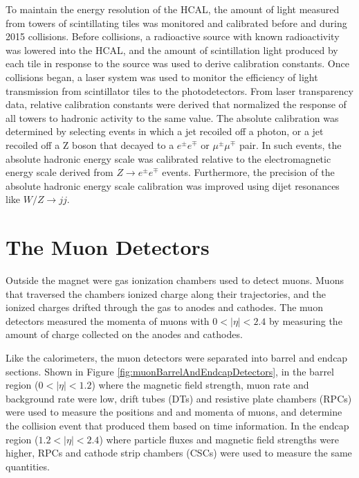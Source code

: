 To maintain the energy resolution of the HCAL, the amount of light measured from towers of scintillating tiles 
was monitored and calibrated before and during 2015 collisions.  Before collisions, a radioactive source 
with known radioactivity was lowered into the HCAL, and the amount of scintillation light produced by each tile 
in response to the source was used to derive calibration constants.  Once collisions began, a laser system 
was used to monitor the efficiency of light transmission from scintillator tiles to the photodetectors.  
From laser transparency data, relative calibration constants were 
derived that normalized the response of all towers to hadronic activity to the same value.  The absolute 
calibration was determined by selecting events in which a jet recoiled off a photon, or a jet recoiled off a Z boson that 
decayed to a $e^{\pm}e^{\mp}$ or $\mu^{\pm}\mu^{\mp}$ pair.  In such events, the absolute hadronic energy 
scale was calibrated relative to the electromagnetic energy scale derived from $Z \rightarrow e^{\pm}e^{\mp}$ 
events.  Furthermore, the precision of the absolute hadronic energy scale calibration was improved using 
dijet resonances like $W/Z \rightarrow jj$.

\section{The Muon Detectors}
\label{sec:muonDetectorsDescription}
Outside the magnet were gas ionization chambers used to detect muons.  Muons that traversed the chambers 
ionized charge along their trajectories, and the ionized charges drifted through the gas to anodes and 
cathodes.  The muon detectors measured the momenta of muons with $0 < |\eta| < 2.4$ by measuring the amount of 
charge collected on the anodes and cathodes.

Like the calorimeters, the muon detectors were separated into barrel and endcap sections.  Shown in Figure \ref{fig:muonBarrelAndEndcapDetectors}, in the barrel 
region ($0 < |\eta| < 1.2$) where the magnetic field strength, muon rate and background rate were low, drift 
tubes (DTs) and resistive plate chambers (RPCs) were used to measure the positions and 
and momenta of muons, and determine the collision event that produced them based on time information.  In the endcap 
region ($1.2 < |\eta| < 2.4$) where particle fluxes and magnetic field strengths were higher, RPCs and cathode 
strip chambers (CSCs) were used to measure the same quantities.

